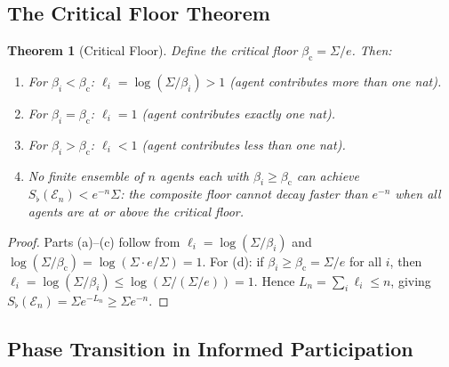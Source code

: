 \documentclass[twocolumn,11pt,a4paper]{article}
\newtheorem{theorem}{Theorem}[section]
\theoremstyle{remark}
\newcommand{\Sflat}{S_{\flat}}
\newcommand{\Ens}{\mathcal{E}}
\newcommand{\logfl}{\ell}                 %
\newcommand{\Logfl}{L}                    %
\newcommand{\Crit}{\beta_{\mathrm{c}}}   %
\begin{document}
\subsection{The Critical Floor Theorem}
\label{sec:fvb:critical}

\begin{theorem}[Critical Floor]
\label{thm:critical}
Define the \emph{critical floor} $\Crit = \Sigma/e$.  Then:
\begin{enumerate}[label=\textup{(\alph*)}]
\item For $\beta_i < \Crit$: $\logfl_i = \log(\Sigma/\beta_i) > 1$
  (agent contributes more than one nat).
\item For $\beta_i = \Crit$: $\logfl_i = 1$ (agent contributes exactly
  one nat).
\item For $\beta_i > \Crit$: $\logfl_i < 1$ (agent contributes less than
  one nat).
\item No finite ensemble of $n$ agents each with $\beta_i \ge \Crit$ can
  achieve $\Sflat(\Ens_n) < e^{-n}\Sigma$: the composite floor cannot decay
  faster than $e^{-n}$ when all agents are at or above the critical floor.
\end{enumerate}
\end{theorem}
\begin{proof}
Parts (a)--(c) follow from $\logfl_i = \log(\Sigma/\beta_i)$ and
$\log(\Sigma/\Crit) = \log(\Sigma \cdot e/\Sigma) = 1$.
For (d): if $\beta_i \ge \Crit = \Sigma/e$ for all $i$, then
$\logfl_i = \log(\Sigma/\beta_i) \le \log(\Sigma/(\Sigma/e)) = 1$.
Hence $\Logfl_n = \sum_i \logfl_i \le n$, giving
$\Sflat(\Ens_n) = \Sigma e^{-\Logfl_n} \ge \Sigma e^{-n}$.
\end{proof}

\subsection{Phase Transition in Informed Participation}
\label{sec:fvb:phase}
\end{document}
